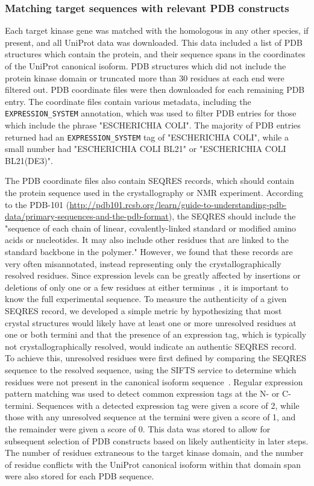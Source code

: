 \documentclass[phd,tocprelim]{cornell}
\begin{document}
\subsubsection{Matching target sequences with relevant PDB constructs}

Each target kinase gene was matched with the homologous in any other species, if present, and all UniProt data was downloaded.
This data included a list of PDB structures which contain the protein, and their sequence spans in the coordinates of the UniProt canonical isoform. PDB structures which did not include the protein kinase domain or truncated more than 30 residues at each end were filtered out. PDB coordinate files were then downloaded for each remaining PDB entry. The coordinate files contain various metadata, including the {\tt EXPRESSION\_SYSTEM} annotation, which was used to filter PDB entries for those which include the phrase "ESCHERICHIA COLI". The majority of PDB entries returned had an {\tt EXPRESSION\_SYSTEM} tag of "ESCHERICHIA COLI", while a small number had "ESCHERICHIA COLI BL21" or "ESCHERICHIA COLI BL21(DE3)".

The PDB coordinate files also contain SEQRES records, which should contain the protein sequence used in the crystallography or NMR experiment.
According to the PDB-101 (\url{http://pdb101.rcsb.org/learn/guide-to-understanding-pdb-data/primary-sequences-and-the-pdb-format}), the SEQRES should include the "sequence of each chain of linear, covalently-linked standard or modified amino acids or nucleotides. It may also include other residues that are linked to the standard backbone in the polymer." However, we found that these records are very often misannotated, instead representing only the crystallographically resolved residues.
Since expression levels can be greatly affected by insertions or deletions of only one or a few residues at either terminus~\citep{klock_combining_2008}, it is important to know the full experimental sequence. To measure the authenticity of a given SEQRES record, we developed a simple metric by hypothesizing that most crystal structures would likely have at least one or more unresolved residues at one or both termini and that the presence of an expression tag, which is typically not crystallographically resolved, would indicate an authentic SEQRES record.
To achieve this, unresolved residues were first defined by comparing the SEQRES sequence to the resolved sequence, using the SIFTS service to determine which residues were not present in the canonical isoform sequence~\citep{doi:10.1093/nar/gks1258}.
Regular expression pattern matching was used to detect common expression tags at the N- or C-termini.
Sequences with a detected expression tag were given a score of 2, while those with any unresolved sequence at the termini were given a score of 1, and the remainder were given a score of 0.
This data was stored to allow for subsequent selection of PDB constructs based on likely authenticity in later steps. The number of residues extraneous to the target kinase domain, and the number of residue conflicts with the UniProt canonical isoform within that domain span were also stored for each PDB sequence. 
\end{document}
